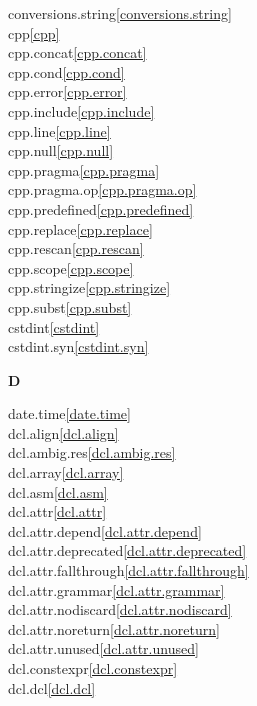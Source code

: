 \begin{multicols}{2}
conversions.string\quad\ref{conversions.string}\\
cpp\quad\ref{cpp}\\
cpp.concat\quad\ref{cpp.concat}\\
cpp.cond\quad\ref{cpp.cond}\\
cpp.error\quad\ref{cpp.error}\\
cpp.include\quad\ref{cpp.include}\\
cpp.line\quad\ref{cpp.line}\\
cpp.null\quad\ref{cpp.null}\\
cpp.pragma\quad\ref{cpp.pragma}\\
cpp.pragma.op\quad\ref{cpp.pragma.op}\\
cpp.predefined\quad\ref{cpp.predefined}\\
cpp.replace\quad\ref{cpp.replace}\\
cpp.rescan\quad\ref{cpp.rescan}\\
cpp.scope\quad\ref{cpp.scope}\\
cpp.stringize\quad\ref{cpp.stringize}\\
cpp.subst\quad\ref{cpp.subst}\\
cstdint\quad\ref{cstdint}\\
cstdint.syn\quad\ref{cstdint.syn}\\
\par \textbf{D}\par
date.time\quad\ref{date.time}\\
dcl.align\quad\ref{dcl.align}\\
dcl.ambig.res\quad\ref{dcl.ambig.res}\\
dcl.array\quad\ref{dcl.array}\\
dcl.asm\quad\ref{dcl.asm}\\
dcl.attr\quad\ref{dcl.attr}\\
dcl.attr.depend\quad\ref{dcl.attr.depend}\\
dcl.attr.deprecated\quad\ref{dcl.attr.deprecated}\\
dcl.attr.fallthrough\quad\ref{dcl.attr.fallthrough}\\
dcl.attr.grammar\quad\ref{dcl.attr.grammar}\\
dcl.attr.nodiscard\quad\ref{dcl.attr.nodiscard}\\
dcl.attr.noreturn\quad\ref{dcl.attr.noreturn}\\
dcl.attr.unused\quad\ref{dcl.attr.unused}\\
dcl.constexpr\quad\ref{dcl.constexpr}\\
dcl.dcl\quad\ref{dcl.dcl}\\

\end{multicols}
